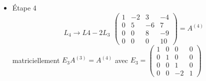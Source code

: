 \documentclass[a4paper]{article}
\begin{document}
\begin{enumerate}
\begin{itemize}
\item Étape 4
\[\begin{array}{cccc}
\\
\\
\\
L_4\rightarrow L4-2L_3
\end{array}\left(\begin{array}{cccc}
1&-2&3&-4\\
0&5&-6&7\\
0&0&8&-9\\
0&0&0&10
\end{array}\right)=A^{(4)}
\]
matriciellement $E_3 A^{(3)}=A^{(4)}$ avec $E_3=\left(\begin{array}{cccc}
1&0&0&0\\
0&1&0&0\\
0&0&1&0\\
0&0&-2&1
\end{array}\right)$


\end{itemize}
\end{enumerate}
\end{document}
